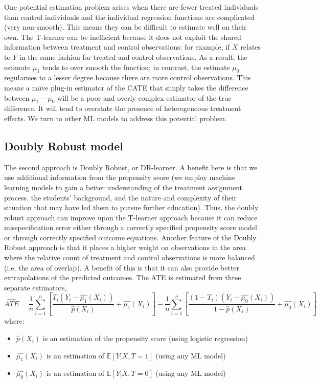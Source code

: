 \documentclass[12pt, a4paper]{article}
\begin{document}
One potential estimation problem arises when there are fewer treated individuals than control individuals and the individual regression functions are complicated (very non-smooth). This means they can be difficult to estimate well on their own. The T-learner can be inefficient because it does not exploit the shared information between treatment and control observations: for example, if $X$ relates to $Y$ in the same fashion for treated and control observations. As a result, the estimate $\mu_1$ tends to over smooth the function; in contrast, the estimate $\mu_0$ regularises to a lesser degree because there are more control observations. This means a na\"ive plug-in estimator of the CATE that simply takes the difference between $\mu_1 - \mu_0$ will be a poor and overly complex estimator of the true difference. It will tend to overstate the presence of heterogeneous treatment effects.
We turn to other ML models to address this potential problem.

\subsection{Doubly Robust model}

The second approach is Doubly Robust, or DR-learner. A benefit here is that we use additional information from the propensity score (we employ machine learning models to gain a better understanding of the treatment assignment process, the students' background, and the nature and complexity of their situation that may have led them to pursue further education). Thus, the doubly robust approach can improve upon the T-learner approach because it can reduce misspecification error either through a correctly specified propensity score model or through correctly specified outcome equations. Another feature of the Doubly Robust approach is that it places a higher weight on observations in the area where the relative count of treatment and control observations is more balanced (i.e. the area of overlap). A benefit of this is that it can also provide better extrapolations of the predicted outcomes. The ATE is estimated from three separate estimators, 
\begin{equation}
\hat{ATE} = \frac{1}{n} {\sum\limits_{i=1}^{n}}\left[ \frac{T_i(Y_i - \hat{\mu_1}(X_i))} {\hat{p}(X_i)} + \hat{\mu_1}(X_i) \right]
- \frac{1}{n} {\sum\limits_{i=1}^{n}} \left[ \frac{(1-T_i)(Y_i - \hat{\mu_0}(X_i))} {1-\hat{p}(X_i)} + \hat{\mu_0}(X_i) \right]
\end{equation}
where:
\begin{itemize}
  \item $\hat{p}(X_i)$ is an estimation of the propensity score (using logistic regression)
  \item $\hat{\mu_1}(X_i)$ is an estimation of $\mathbb{E}[Y|X,T=1]$ (using any ML model)
  \item $\hat{\mu_0}(X_i)$ is an estimation of $\mathbb{E}[Y|X,T=0]$ (using any ML model)
\end{itemize}
\end{document}
